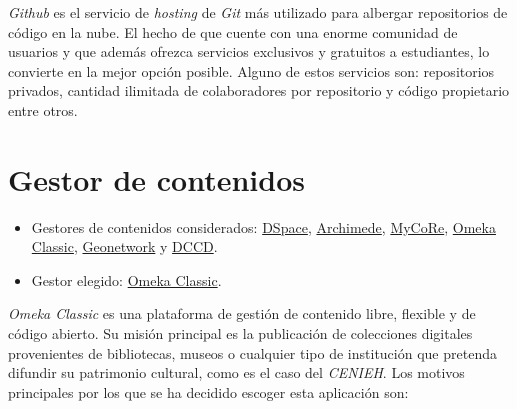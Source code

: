 \emph{Github} es el servicio de \emph{hosting} de \emph{Git} más utilizado para albergar
repositorios de código en la nube. El hecho de que cuente con una enorme
comunidad de usuarios y que además ofrezca servicios exclusivos y
gratuitos a estudiantes, lo convierte en la mejor opción posible. Alguno
de estos servicios son: repositorios privados, cantidad ilimitada de
colaboradores por repositorio y código propietario entre otros.

\section{Gestor de contenidos}

\begin{itemize}
\tightlist
\item
  Gestores de contenidos considerados:
  \href{https://duraspace.org/dspace/}{DSpace},
  \href{https://www.bibl.ulaval.ca/archimede/index.en.html}{Archimede},
  \href{https://www.mycore.de/}{MyCoRe},
  \href{https://omeka.org/classic/}{Omeka Classic},
  \href{https://github.com/geonetwork/core-geonetwork/}{Geonetwork} y
  \href{https://github.com/DANS-KNAW/dccd-webui}{DCCD}.
\item
  Gestor elegido: \href{https://omeka.org/classic/}{Omeka Classic}.
\end{itemize}

\emph{Omeka Classic} es una plataforma de gestión de contenido libre,
flexible y de código abierto. Su misión principal es la publicación de
colecciones digitales provenientes de bibliotecas, museos o cualquier
tipo de institución que pretenda difundir su patrimonio cultural, como
es el caso del \emph{CENIEH}. Los motivos principales por los que se ha
decidido escoger esta aplicación son:

